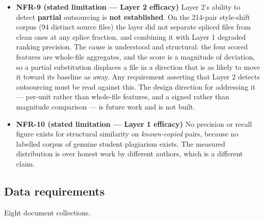 \begin{itemize}
  ten extracted.
\item
  \textbf{NFR-9 (stated limitation --- Layer 2 efficacy)} Layer 2's
  ability to detect \textbf{partial} outsourcing is \textbf{not
  established}. On the 214-pair style-shift corpus (94 distinct source
  files) the layer did not separate spliced files from clean ones at any
  splice fraction, and combining it with Layer 1 degraded ranking
  precision. The cause is understood and structural: the four scored
  features are whole-file aggregates, and the score is a magnitude of
  deviation, so a partial substitution displaces a file in a direction
  that is as likely to move it toward its baseline as away. Any
  requirement asserting that Layer 2 detects outsourcing must be read
  against this. The design direction for addressing it --- per-unit
  rather than whole-file features, and a signed rather than magnitude
  comparison --- is future work and is not built.
\item
  \textbf{NFR-10 (stated limitation --- Layer 1 efficacy)} No precision
  or recall figure exists for structural similarity on
  \emph{known-copied} pairs, because no labelled corpus of genuine
  student plagiarism exists. The measured distribution is over honest
  work by different authors, which is a different claim.
\end{itemize}

\hypertarget{data-requirements}{%
\subsection{Data requirements}\label{data-requirements}}

Eight document collections.

